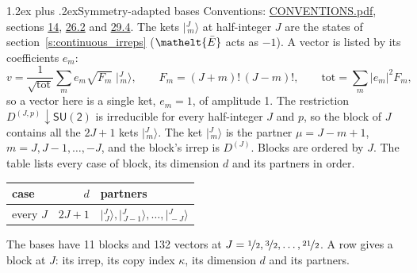 \documentclass[10pt,a4paper]{article}
\makeatletter
\renewcommand\section{\@startsection{section}{1}{\z@}{-3ex plus -1ex minus -.2ex}%
  {1.2ex plus .2ex}{\normalfont\large\sffamily\bfseries\color{parttitle}}}
\numberwithin{equation}{section}
\newcommand{\eltfont}[1]{{\let\sigma\eltsigma\mathelt{#1}}}
\newcommand{\grp}[1]{\mathsf{#1}}
\newcommand{\elt}[1]{\eltfont{#1}}
\newcommand{\restr}[2]{#1\!\downarrow#2}
\newcommand{\irrJ}[1]{D^{(#1)}}
\newcommand{\irrJp}[2]{D^{(#1,#2)}}
\newcommand{\mult}{\kappa}
\newcommand{\intx}{\mu}
\newcommand{\jm}[2]{\bigl\lvert{}^{#1}_{\,#2}\bigr\rangle}
\newcommand{\barred}[1]{\bar{#1}}
\makeatother
\begin{document}
\section{Symmetry-adapted bases}\label{s:bases}
Conventions: \href{../../CONVENTIONS.pdf}{CONVENTIONS.pdf}, sections \href{../../../rotation/CONVENTIONS.pdf\#conv.14}{14}, \href{../../CONVENTIONS.pdf\#conv.26.2}{26.2} and \href{../../CONVENTIONS.pdf\#conv.29.4}{29.4}.
\leavevmode\label{n:index.m}\label{n:vector.ket}The kets $\jm{J}{m}$ at half-integer $J$ are the states of section~\ref{s:continuous_irreps} ($\elt{\barred{E}}$ acts as $-1$). \label{n:index.ketcoefficient}\label{n:vector.basis.symmetry}\label{n:index.ketweight}\label{n:index.total}A vector is listed by its coefficients $e_m$:
\begin{equation}\label{e:ket}v = \frac{1}{\sqrt{\mathrm{tot}}}\sum_m e_m\sqrt{F_m}\;\jm{J}{m},\qquad F_m = (J+m)!\,(J-m)!,\qquad \mathrm{tot} = \sum_m |e_m|^2F_m,\end{equation}
so a vector here is a single ket, $e_m = 1$, of amplitude 1.
The restriction $\restr{\irrJp{J}{p}}{\grp{SU(2)}}$ is irreducible for every half-integer $J$ and $p$, so the block of $J$ contains all the $2J+1$ kets $\jm{J}{m}$. The ket $\jm{J}{m}$ is the partner $\intx = J - m + 1$, $m = J, J-1, \dots, -J$, and the block's irrep is $\irrJ{J}$. Blocks are ordered by $J$. \label{n:head.case}\label{n:head.partners}The table lists every case of block, its dimension $d$ and its partners in order.
\begin{center}\begin{tabular}{@{}lrl@{}}\toprule
case & $d$ & partners\\\midrule
every $J$ & $2J+1$ & $\jm{J}{J}, \jm{J}{J-1}, \dots, \jm{J}{-J}$\\
\bottomrule\end{tabular}\end{center}
The bases have 11 blocks and 132 vectors at $J = \nicefrac{1}{2}, \nicefrac{3}{2}, \dots, \nicefrac{21}{2}$. \label{n:index.copy}\label{n:head.irrep}A row gives a block at $J$: its irrep, its copy index $\mult$, its dimension $d$ and its partners.
\end{document}
